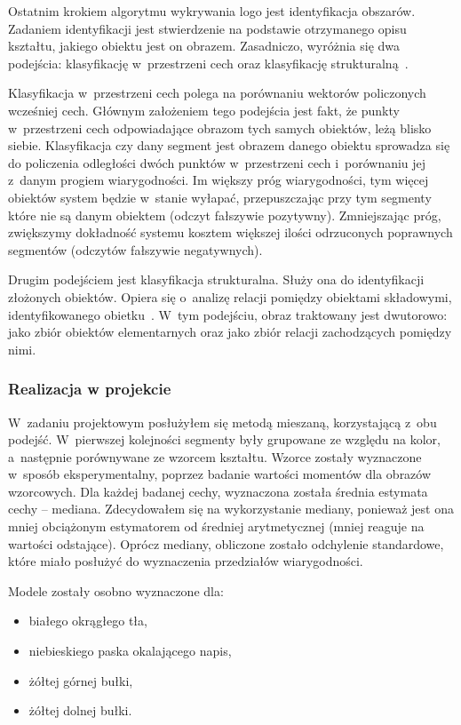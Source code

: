 Ostatnim krokiem algorytmu wykrywania logo \bk jest identyfikacja obszarów. Zadaniem identyfikacji jest stwierdzenie na podstawie otrzymanego opisu kształtu, jakiego obiektu jest on obrazem. Zasadniczo, wyróżnia się dwa podejścia: klasyfikację w~przestrzeni cech oraz klasyfikację strukturalną~\cite{pobr:wyklad}.

Klasyfikacja w~przestrzeni cech polega na porównaniu wektorów policzonych wcześniej cech. Głównym założeniem tego podejścia jest fakt, że punkty w~przestrzeni cech odpowiadające obrazom tych samych obiektów, leżą blisko siebie. Klasyfikacja czy dany segment jest obrazem danego obiektu sprowadza się do policzenia odległości dwóch punktów w~przestrzeni cech i~porównaniu jej z~danym progiem wiarygodności. Im większy próg wiarygodności, tym więcej obiektów system będzie w~stanie wyłapać, przepuszczając przy tym segmenty które nie są danym obiektem (odczyt fałszywie pozytywny). Zmniejszając próg, zwiększymy dokładność systemu kosztem większej ilości odrzuconych poprawnych segmentów (odczytów fałszywie negatywnych).

Drugim podejściem jest klasyfikacja strukturalna. Służy ona do identyfikacji złożonych obiektów. Opiera się o~analizę relacji pomiędzy obiektami składowymi, identyfikowanego obietku~\cite{pobr:wyklad}. W~tym podejściu, obraz traktowany jest dwutorowo: jako zbiór obiektów elementarnych oraz jako zbiór relacji zachodzących pomiędzy nimi.

\subsubsection{Realizacja w projekcie}
W~zadaniu projektowym posłużyłem się metodą mieszaną, korzystającą z~obu podejść. W~pierwszej kolejności segmenty były grupowane ze względu na kolor, a~następnie porównywane ze wzorcem kształtu. Wzorce zostały wyznaczone w~sposób eksperymentalny, poprzez badanie wartości momentów dla obrazów wzorcowych. Dla każdej badanej cechy, wyznaczona została średnia estymata cechy -- mediana. Zdecydowałem się na wykorzystanie mediany, ponieważ jest ona mniej obciążonym estymatorem od średniej arytmetycznej (mniej reaguje na wartości odstające). Oprócz mediany, obliczone zostało odchylenie standardowe, które miało posłużyć do wyznaczenia przedziałów wiarygodności. 

Modele zostały osobno wyznaczone dla:
\begin{itemize}
    \item białego okrągłego tła,
    \item niebieskiego paska okalającego napis,
    \item żółtej górnej bułki,
    \item żółtej dolnej bułki. 
\end{itemize}


